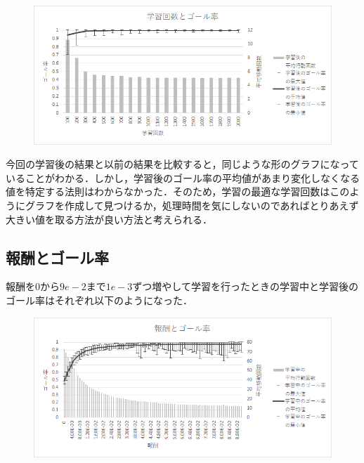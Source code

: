 \documentclass[a4j,11pt]{jarticle}
\begin{document}
\begin{figure}[ht]
  \begin{center}
    \includegraphics[scale=1.5]{img/valLearningLimit10.png}
  \end{center}
\end{figure}

今回の学習後の結果と以前の結果を比較すると，同じような形のグラフになっていることがわかる．しかし，学習後のゴール率の平均値があまり変化しなくなる値を特定する法則はわからなかった．そのため，学習の最適な学習回数はこのようにグラフを作成して見つけるか，処理時間を気にしないのであればとりあえず大きい値を取る方法が良い方法と考えられる．

\newpage

\subsection{報酬とゴール率}

報酬を$0$から$9e-2$まで$1e-3$ずつ増やして学習を行ったときの学習中と学習後のゴール率はそれぞれ以下のようになった．

\begin{figure}[ht]
  \begin{center}
    \includegraphics[scale=1.5]{img/changeP10.png}
  \end{center}
\end{figure}
\end{document}
